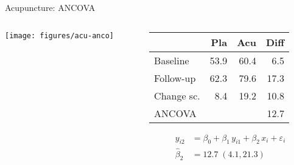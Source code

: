 \documentclass{beamer}
\begin{document}
\begin{frame}{Acupuncture: ANCOVA}
\begin{columns}[T]
\begin{column}{5.5cm}
  \texttt{[image: figures/acu-anco]}
\end{column}
%
\begin{column}{5.5cm}
  \vspace*{1em}\small
  \begin{tabular}{lrrr}
  \hline
             &  Pla &  Acu & Diff \\ \hline
  Baseline   & 53.9 & 60.4 &  6.5 \\
  Follow-up  & 62.3 & 79.6 & 17.3 \\
  Change sc. &  8.4 & 19.2 & 10.8 \\
  ANCOVA     &      &      & 12.7 \\ \hline
  \end{tabular}
\begin{align*}
         y_{i2} &= \beta_0 + \beta_1 \, y_{i1} + \beta_2 \, x_i +
                    \varepsilon_i \\
  \hat{\beta}_2 &= 12.7 \; (4.1, 21.3)
\end{align*}
\end{column}
\end{columns}
\end{frame}
\end{document}

